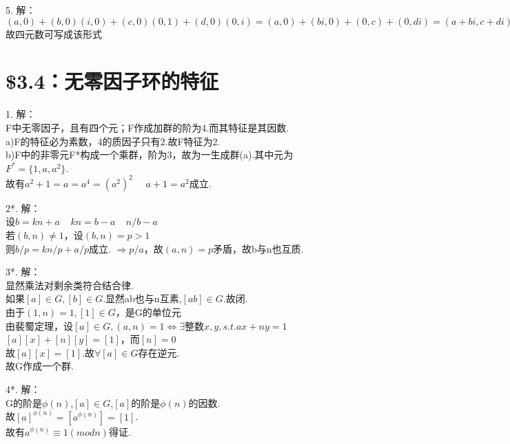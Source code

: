 \documentclass{ctexart}
\begin{document}
5.
解：\\
$(a,0)+(b,0)(i,0)+(c,0)(0,1)+(d,0)(0,i)=(a,0)+(bi,0)+(0,c)+(0,di)=(a+bi,c+di)$\\
故四元数可写成该形式
\section*{\$3.4：无零因子环的特征}
1. 
解：\\
F中无零因子，且有四个元；F作成加群的阶为4.而其特征是其因数.\\
a)F的特征必为素数，4的质因子只有2.故F特征为2. \\
b)F中的非零元F*构成一个乘群，阶为3，故为一生成群(a).其中元为$F^*=\{1,a,a^2\}$.\\
故有$a^2+1=a=a^4=(a^2)^2 \ \ \ \ \ \ a+1=a^2$成立.

2*. 
解：\\
设$b=kn+a \ \ \ \ \ kn=b-a \ \ \ \ \ n/b-a$\\
若$(b,n) \neq 1$，设$(b,n)=p>1$ \\
则$b/p=kn/p+a/p$成立. $\Rightarrow p/a$，故$(a,n)=p$矛盾，故b与n也互质.

3*. 
解：\\
显然乘法对剩余类符合结合律.\\
如果$[a]\in G,[b]\in G$.显然ab也与n互素,$[ab] \in G$.故闭. \\
由于$(1,n)=1,[1] \in G$，是G的单位元\\
由裴蜀定理，设$[a] \in G,(a,n)=1 \Leftrightarrow \exists$整数$x,y,s.t. ax+ny=1$ \\
$[a][x]+[n][y]=[1]$，而$[n]=0$ \\
故$[a][x]=[1]$.故$\forall [a] \in G$存在逆元.\\
故G作成一个群.

4*.
解：\\
G的阶是$\phi(n)$,$[a] \in G$,$[a]$的阶是$\phi(n)$的因数.\\
故$[a]^{\phi(n)}=[a^{\phi(n)}]=[1]$.\\
故有$a^{\phi(n)} \equiv 1(mod n)$得证.
\end{document}
